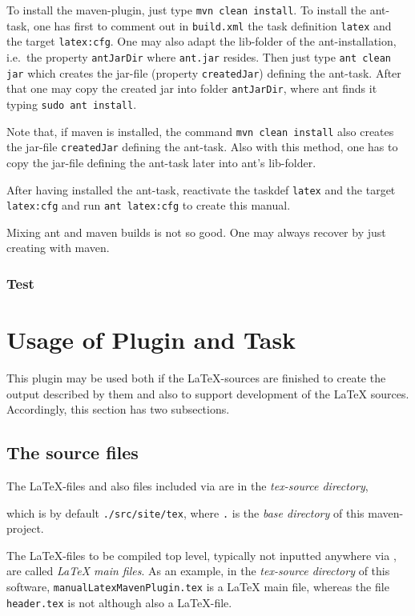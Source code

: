 \documentclass[12pt]{book}
\renewcommand{\index}[1]{ }
\begin{document}
To install the maven-plugin, just type \texttt{mvn clean install}. 
To install the ant-task, one has first to comment out in \texttt{build.xml} 
the task definition \texttt{latex} and the target \texttt{latex:cfg}. 
One may also adapt the lib-folder of the ant-installation, 
i.e.~the property \texttt{antJarDir} where \texttt{ant.jar} resides. 
Then just type \texttt{ant clean jar} 
which creates the jar-file (property \texttt{createdJar}) defining the ant-task. 
After that one may copy the created jar into folder \texttt{antJarDir}, 
where ant finds it typing \texttt{sudo ant install}. 
\index{ant-task}

Note that, if maven is installed, the command \texttt{mvn clean install} 
also creates the jar-file \texttt{createdJar} defining the ant-task. 
Also with this method, one has to copy the jar-file defining the ant-task 
later into ant's lib-folder. 

After having installed the ant-task, 
reactivate the taskdef \texttt{latex} and the target \texttt{latex:cfg} 
and run \texttt{ant latex:cfg} to create this manual. 

Mixing ant and maven builds is not so good. 
One may always recover by just creating with maven. 

\subsection{Test}

\chapter{Usage of Plugin and Task}\label{chap:usage}

This plugin may be used both if the \LaTeX-sources are finished 
to create the output described by them 
and also to support development of the \LaTeX{} sources. 
Accordingly, this section has two subsections. 

\section{The source files}\label{sec:sources}

The \LaTeX-files and also files included via  
are in the {\em tex-source directory}, 
\index{tex-source directory}
which is by default \texttt{./src/site/tex}, 
where \texttt{.} is the {\em base directory\/} of this maven-project. 
\index{base directory}
The \LaTeX-files to be compiled top level, 
typically not inputted anywhere via , 
are called {\em \LaTeX{} main files}. 
As an example, 
in the {\em tex-source directory\/} of this software, 
\texttt{manualLatexMavenPlugin.tex} is a \LaTeX{} main file, 
whereas the file \texttt{header.tex} is not although also a \LaTeX-file. 
\index{latex main file}
\end{document}
